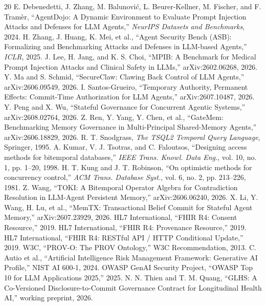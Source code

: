 \documentclass[conference,a4paper]{IEEEtran}
\begin{document}
\balance
\begin{thebibliography}{20}
 E. Debenedetti, J. Zhang, M. Balunovi\'c, L. Beurer-Kellner, M. Fischer, and F. Tram\`er, ``AgentDojo: A Dynamic Environment to Evaluate Prompt Injection Attacks and Defenses for LLM Agents,'' \emph{NeurIPS Datasets and Benchmarks}, 2024.
 H. Zhang, J. Huang, K. Mei, et al., ``Agent Security Bench (ASB): Formalizing and Benchmarking Attacks and Defenses in LLM-based Agents,'' \emph{ICLR}, 2025.
 J. Lee, H. Jang, and K. S. Choi, ``MPIB: A Benchmark for Medical Prompt Injection Attacks and Clinical Safety in LLMs,'' arXiv:2602.06268, 2026.
 Y. Ma and S. Schmid, ``SecureClaw: Clawing Back Control of LLM Agents,'' arXiv:2606.09549, 2026.
 I. Santos-Grueiro, ``Temporary Authority, Permanent Effects: Commit-Time Authorization for LLM Agents,'' arXiv:2607.10487, 2026.
 Y. Peng and X. Wu, ``Stateful Governance for Concurrent Agentic Systems,'' arXiv:2608.02764, 2026.
 Z. Ren, Y. Yang, Y. Chen, et al., ``GateMem: Benchmarking Memory Governance in Multi-Principal Shared-Memory Agents,'' arXiv:2606.18829, 2026.
 R. T. Snodgrass, \emph{The TSQL2 Temporal Query Language}, Springer, 1995.
 A. Kumar, V. J. Tsotras, and C. Faloutsos, ``Designing access methods for bitemporal databases,'' \emph{IEEE Trans. Knowl. Data Eng.}, vol. 10, no. 1, pp. 1--20, 1998.
 H. T. Kung and J. T. Robinson, ``On optimistic methods for concurrency control,'' \emph{ACM Trans. Database Syst.}, vol. 6, no. 2, pp. 213--226, 1981.
 Z. Wang, ``TOKI: A Bitemporal Operator Algebra for Contradiction Resolution in LLM-Agent Persistent Memory,'' arXiv:2606.06240, 2026.
 X. Li, Y. Wang, H. Lu, et al., ``MemTX: Transactional Belief Commit for Stateful Agent Memory,'' arXiv:2607.23929, 2026.
 HL7 International, ``FHIR R4: Consent Resource,'' 2019.
 HL7 International, ``FHIR R4: Provenance Resource,'' 2019.
 HL7 International, ``FHIR R4: RESTful API / HTTP Conditional Update,'' 2019.
 W3C, ``PROV-O: The PROV Ontology,'' W3C Recommendation, 2013.
 C. Autio et al., ``Artificial Intelligence Risk Management Framework: Generative AI Profile,'' NIST AI 600-1, 2024.
 OWASP GenAI Security Project, ``OWASP Top 10 for LLM Applications 2025,'' 2025.
 N. N. Thien and T. M. Quang, ``GLHS: A Co-Versioned Disclosure-to-Commit Governance Contract for Longitudinal Health AI,'' working preprint, 2026.
\end{thebibliography}
\end{document}

